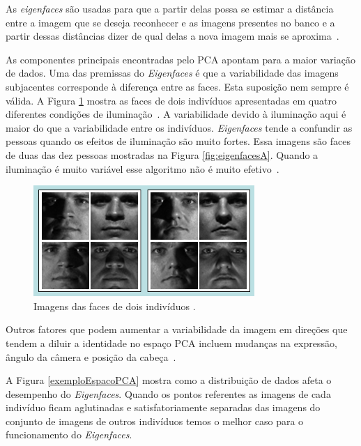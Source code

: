 	As \textit{eigenfaces} são usadas para que a
	partir delas possa se estimar a distância entre a imagem que se deseja
	reconhecer e as imagens presentes no banco e a partir dessas distâncias dizer de
	qual delas a nova imagem mais se aproxima~\cite{turkpentland}.

	As componentes principais encontradas pelo PCA apontam para a maior variação de
	dados. Uma das premissas do \textit{Eigenfaces} é que a variabilidade das
	imagens subjacentes corresponde à diferença entre as faces. Esta suposição nem
	sempre é válida. A Figura \ref{exemplosImagensIluminacaoo} mostra as faces de
	dois indivíduos apresentadas em quatro diferentes condições de
	iluminação~\cite{hewitt}. A variabilidade devido à iluminação aqui é maior do
	que a variabilidade entre os indivíduos. \textit{Eigenfaces} tende a confundir
	as pessoas quando os efeitos de iluminação são muito fortes. Essa imagens são
	faces de duas das dez pessoas mostradas na Figura \ref{fig:eigenfacesA}.
	Quando a iluminação é muito variável esse algoritmo não é muito
	efetivo~\cite{hewitt}.
	
	\begin{figure}[htb]
		\begin{center}
			\includegraphics[scale=1.2]{figuras/2.FundamentacaoTeorica/exemplosImagensIluminacaoo.png}
		\end{center}
		\caption{Imagens das faces de dois indivíduos \cite{hewitt}.}
		\label{exemplosImagensIluminacaoo}
	\end{figure}

	Outros fatores que podem aumentar a variabilidade da imagem em direções que
	tendem a diluir a identidade no espaço PCA incluem mudanças na expressão, ângulo
	da câmera e posição da cabeça~\cite{hewitt}.
	
	A Figura \ref{exemploEspacoPCA} mostra como a distribuição de dados afeta o
	desempenho do \textit{Eigenfaces}. Quando os pontos referentes as imagens de
	cada indivíduo ficam aglutinadas e satisfatoriamente separadas das imagens do conjunto de imagens de outros
	indivíduos temos o melhor caso para o funcionamento do \textit{Eigenfaces}.


